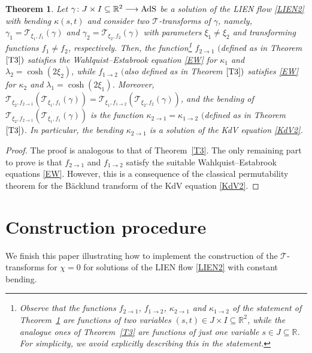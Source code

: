\documentclass[pdftex]{sigma}
\numberwithin{equation}{section}
\newtheorem{Theorem}{Theorem}[section]
\def\bending{\kappa}
\def\R{\mathbb{R}}
\def\AdS{{\rm AdS}}
\begin{document}
\begin{Theorem}\label{5.13} Let $\gamma\colon J\times I\subseteq\R^2\longrightarrow\AdS$ be a solution of the LIEN flow \eqref{LIEN2} with bending $\bending(s,t)$ and consider two $\mathcal{T}$-transforms of $\gamma$, namely, $\gamma_1=\mathcal{T}_{\xi_1,f_1}(\gamma)$ and $\gamma_2=\mathcal{T}_{\xi_2,f_2}(\gamma)$ with parameters $\xi_1\neq \xi_2$ and transforming functions $f_1\neq f_2$, respectively. Then, the function\footnote{Observe that the functions $f_{2\to 1}$, $f_{1\to 2}$, $\bending_{2\to 1}$ and $\bending_{1\to 2}$ of the statement of Theorem~\ref{5.13} are functions of two variables $(s,t)\in J\times I\subseteq\R^2$, while the analogue ones of Theorem~\ref{T3} are functions of just one variable $s\in J\subseteq\R$. For simplicity, we avoid explicitly describing this in the statement.} $f_{2\to 1}$ $($defined as in Theorem $\ref{T3})$ satisfies the Wahlquist--Estabrook equation \eqref{EW} for $\bending_1$ and $\lambda_2=\cosh(2\xi_2)$, while $f_{1\to 2}$ $($also defined as in Theorem $\ref{T3})$ satisfies \eqref{EW} for $\bending_2$ and $\lambda_1=\cosh(2\xi_1)$. Moreover,
$\mathcal{T}_{\xi_2,f_{2\to 1}}(\mathcal{T}_{\xi_1,f_1}(\gamma))=\mathcal{T}_{\xi_1,f_{1\to 2}}(\mathcal{T}_{\xi_2,f_2}(\gamma))$,
	and the bending of $\mathcal{T}_{\xi_2,f_{2\to 1}}(\mathcal{T}_{\xi_1,f_1}(\gamma))$ is the function $\bending_{2\to 1}=\bending_{1\to 2}$ $($defined as in Theorem $\ref{T3})$. In particular, the bending $\bending_{2\to 1}$ is a solution of the KdV equation \eqref{KdV2}.
\end{Theorem}
\begin{proof}
	The proof is analogous to that of Theorem~\ref{T3}. The only remaining part to prove is that $f_{2\to 1}$ and $f_{1\to 2}$ satisfy the suitable Wahlquist--Estabrook equations \eqref{EW}. However, this is a consequence of the classical permutability theorem for the B\"{a}cklund transform of the KdV equation \eqref{KdV2}.
\end{proof}

\section{Construction procedure}\label{section5}

We finish this paper illustrating how to implement the construction of the $\mathcal{T}$-transforms for $\chi=0$ for solutions of the LIEN flow \eqref{LIEN2} with constant bending.
\end{document}
